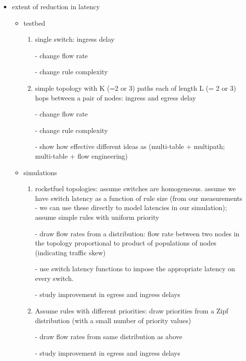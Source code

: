 \begin{itemize}

\item extent of reduction in latency
\begin{itemize}

\item testbed 

\begin{enumerate} 
\item single switch: ingress delay

- change flow rate

- change rule complexity

\item simple topology with K (=2 or 3) paths each of length L (= 2 or 3) hops between a pair of nodes: ingress and egress delay

- change flow rate

- change rule complexity

- show how effective different ideas as (multi-table + multipath; multi-table + flow engineering)

\end{enumerate}

\item simulations

\begin{enumerate} 

\item rocketfuel topologies: assume switches are homogeneous. assume we have switch latency as a function of rule size (from our measurements - we can use these directly to model latencies in our simulation); assume simple rules with uniform priority

- draw flow rates from a distribution: flow rate between two nodes in the topology proportional to product of populations of nodes (indicating traffic skew)

- use switch latency functions to impose the appropriate latency on every switch.

- study improvement in egress and ingress delays

\item Assume rules with different priorities: draw priorities from a Zipf distribution (with a small number of priority values)

- draw flow rates from same distribution as above

- study improvement in egress and ingress delays

\end{enumerate}


\end{itemize}
\end{itemize}
